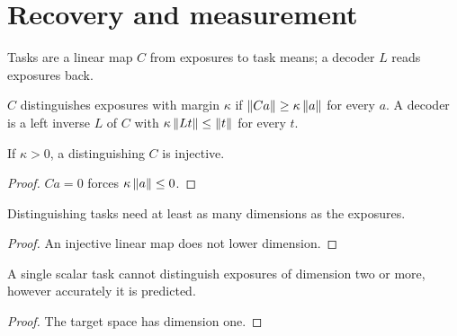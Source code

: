\section{Recovery and measurement}\label{sec:bp-recovery}

Tasks are a linear map $C$ from exposures to task means; a decoder $L$ reads
exposures back.

\begin{definition}\label{def:recovery}
  \leanok
  $C$ distinguishes exposures with margin $\kappa$ if
  $\left\lVert Ca\right\rVert\ge\kappa\left\lVert a\right\rVert$ for every $a$. A decoder is a left inverse $L$
  of $C$ with $\kappa\left\lVert Lt\right\rVert\le\left\lVert t\right\rVert$ for every $t$.
\end{definition}

\begin{lemma}\label{thm:recovery-injective}
  \leanok
  If $\kappa>0$, a distinguishing $C$ is injective.
\end{lemma}
\begin{proof}\leanok
  $Ca=0$ forces $\kappa\left\lVert a\right\rVert\le0$.
\end{proof}

\begin{lemma}[Dimension]\label{thm:recovery-finrank}
  \leanok
  Distinguishing tasks need at least as many dimensions as the exposures.
\end{lemma}
\begin{proof}\leanok
  An injective linear map does not lower dimension.
\end{proof}

\begin{theorem}\label{thm:recovery-scalar}
  \leanok
  A single scalar task cannot distinguish exposures of dimension two or more,
  however accurately it is predicted.
\end{theorem}
\begin{proof}\leanok
  The target space has dimension one.
\end{proof}

